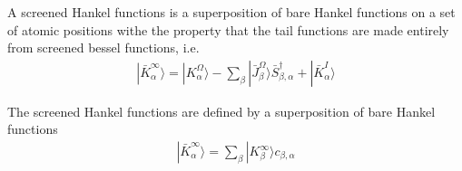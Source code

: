 \documentclass[11pt,a4paper]{report}
\begin{document}
A screened Hankel functions is a superposition of bare Hankel
functions on a set of atomic positions withe the property that the
tail functions are made entirely from screened bessel functions, i.e.
\begin{eqnarray}
|\bar{K}_{\alpha}^\infty\rangle=|K^\Omega_{\alpha}\rangle
-\sum_{\beta}|\bar{J}^\Omega_{\beta}\rangle \bar{S}^\dagger_{\beta,\alpha}
+|\bar{K}^I_{\alpha}\rangle
\label{eq:kbarwithsbar}
\end{eqnarray}

The screened Hankel functions are defined by a superposition of bare
Hankel functions
\begin{eqnarray}
|\bar{K}^\infty_\alpha\rangle=\sum_\beta|K^\infty_\beta\rangle c_{\beta,\alpha}
\label{eq:kbarassuperposofkbare}
\end{eqnarray}
\end{document}
